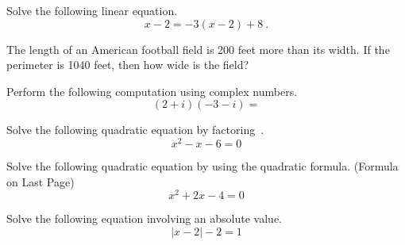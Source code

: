 \documentclass[addpoints,12pt]{exam}
\begin{document}
\begin{questions}
	\question Solve the following linear equation. 
   \[
 x-2 = -3(x-2)+8~.
\]\vfill

\question The length of an American football field is 200 feet more than its width. If the perimeter is 1040 feet, then how wide is the field? \vfill

\question Perform the following computation using complex numbers. 
\[
		 (2+i)(-3-i)=
\] \vfill

\newpage

\question Solve the following quadratic equation by factoring~. 
\[
	x^{2}-x-6=0 
\]

\vfill

\question Solve the following quadratic equation by using the quadratic formula. (Formula on Last Page)
   \[
x^{2}+2x-4=0
\]

\vfill

\question  Solve the following equation involving an absolute value. 
	    \[
	  |x-2|-2=1
	 \]
\vfill
\newpage


\end{questions}
\end{document}
